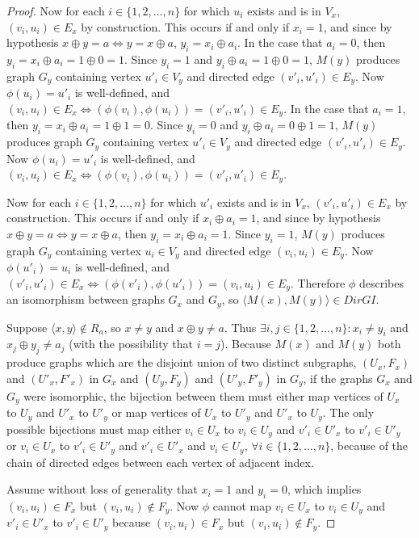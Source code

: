 \documentclass{article}
\theoremstyle{definition} \newtheorem{definition}[definition]{Definition}
\newcommand{\pair}[2]{\langle#1,#2\rangle} %
\begin{document}
\begin{proof}
  Now for each $i\in\{1, 2, \ldots, n\}$ for which $u_i$ exists and is in
  $V_x$, $(v_i, u_i)\in E_x$ by construction. This occurs if and only if
  $x_i=1$, and since by hypothesis $x\oplus y=a \iff y=x\oplus a$,
  $y_i=x_i\oplus a_i$. In the case that $a_i=0$, then $y_i=x_i\oplus a_i=
  1\oplus 0=1$. Since $y_i=1$ and $y_i\oplus a_i=1\oplus 0=1$, $M(y)$ produces
  graph $G_y$ containing vertex $u'_i\in V_y$ and directed edge $(v'_i,
  u'_i)\in E_y$. Now $\phi(u_i)=u'_i$ is well-defined, and $(v_i, u_i)\in
  E_x\iff (\phi(v_i), \phi(u_i))=(v'_i, u'_i)\in E_y$. In the case that
  $a_i=1$, then $y_i=x_i\oplus a_i=1\oplus1=0$. Since $y_i=0$ and $y_i\oplus
  a_i=0\oplus 1=1$, $M(y)$ produces graph $G_y$ containing vertex $u'_i\in V_y$
  and directed edge $(v'_i, u'_i)\in E_y$. Now $\phi(u_i)=u'_i$ is
  well-defined, and $(v_i, u_i)\in E_x\iff (\phi(v_i), \phi(u_i))=(v'_i,
  u'_i)\in E_y$.

  Now for each $i\in\{1, 2, \ldots, n\}$ for which $u'_i$ exists and is in
  $V_x$, $(v'_i, u'_i)\in E_x$ by construction. This occurs if and only if
  $x_i\oplus a_i=1$, and since by hypothesis $x\oplus y=a \iff y=x\oplus a$,
  then $y_i=x_i\oplus a_i=1$. Since $y_i=1$, $M(y)$ produces graph $G_y$
  containing vertex $u_i\in V_y$ and directed edge $(v_i, u_i)\in E_y$. Now
  $\phi(u'_i)=u_i$ is well-defined, and $(v'_i, u'_i)\in E_x\iff (\phi(v'_i),
  \phi(u'_i))=(v_i, u_i)\in E_y$. Therefore $\phi$ describes an isomorphism
  between graphs $G_x$ and $G_y$, so $\pair{M(x)}{M(y)}\in DirGI$.

  Suppose $\pair{x}{y}\notin R_a$, so $x\neq y$ and $x\oplus y\neq a$. Thus
  $\exists i,j\in\{1, 2, \ldots, n\}: x_i\neq y_i$ and $x_j\oplus y_j\neq a_j$
  (with the possibility that $i=j$). Because $M(x)$ and $M(y)$ both produce
  graphs which are the disjoint union of two distinct subgraphs, $(U_x, F_x)$
  and $(U'_x, F'_x)$ in $G_x$ and $(U_y, F_y)$ and $(U'_y, F'_y)$ in $G_y$, if
  the graphs $G_x$ and $G_y$ were isomorphic, the bijection between them must
  either map vertices of $U_x$ to $U_y$ and $U'_x$ to $U'_y$ or map vertices of
  $U_x$ to $U'_y$ and $U'_x$ to $U_y$. The only possible bijections must map
  either $v_i\in U_x$ to $v_i\in U_y$ and $v'_i\in U'_x$ to $v'_i\in U'_y$ or
  $v_i\in U_x$ to $v'_i\in U'_y$ and $v'_i\in U'_x$ and $v_i\in U_y$, $\forall
  i\in\{1, 2, \ldots, n\}$, because of the chain of directed edges between each
  vertex of adjacent index.

  Assume without loss of generality that $x_i=1$ and $y_i=0$, which implies
  $(v_i, u_i)\in F_x$ but $(v_i, u_i)\notin F_y$. Now $\phi$ cannot map $v_i\in
  U_x$ to $v_i\in U_y$ and $v'_i\in U'_x$ to $v'_i\in U'_y$ because $(v_i,
  u_i)\in F_x$ but $(v_i, u_i)\notin F_y$. 


\end{proof}
\end{document}
